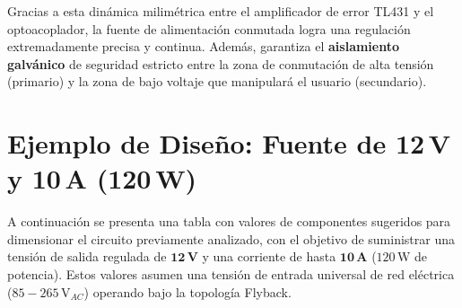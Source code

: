\documentclass[12pt, a4paper]{article}
\begin{document}
Gracias a esta dinámica milimétrica entre el amplificador de error TL431 y el optoacoplador, la fuente de alimentación conmutada logra una regulación extremadamente precisa y continua. Además, garantiza el \textbf{aislamiento galvánico} de seguridad estricto entre la zona de conmutación de alta tensión (primario) y la zona de bajo voltaje que manipulará el usuario (secundario).

\newpage
\section{Ejemplo de Diseño: Fuente de 12\,V y 10\,A (120\,W)}

A continuación se presenta una tabla con valores de componentes sugeridos para dimensionar el circuito previamente analizado, con el objetivo de suministrar una tensión de salida regulada de $\mathbf{12\,\text{V}}$ y una corriente de hasta $\mathbf{10\,\text{A}}$ ($120\,\text{W}$ de potencia). Estos valores asumen una tensión de entrada universal de red eléctrica ($85 - 265\,\text{V}_{AC}$) operando bajo la topología Flyback.
\end{document}
